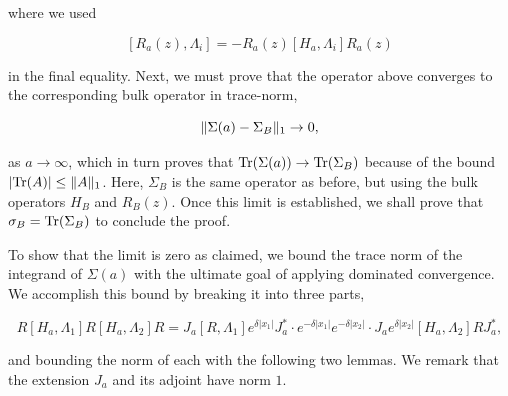 \documentclass[12pt, letterpaper]{article}
\begin{document}
where we used 

\[[R_a(z),\Lambda_i] = -R_a(z)[H_a,\Lambda_i]R_a(z)\]

in the final equality. Next, we must prove that the operator above converges to the corresponding bulk operator in trace-norm,

\[ \lVert \Sigma(a) - \Sigma_B \rVert_1 \to 0,\]

as $a\to\infty$, which in turn proves that $\text{Tr}(\Sigma(a))\to\text{Tr}(\Sigma_B)$ because of the bound $|\text{Tr}(A)|\leq \lVert A \rVert_1$. Here, $\Sigma_B$ is the same operator as before, but using the bulk operators $H_B$ and $R_B(z)$. Once this limit is established, we shall prove that $\sigma_B = \text{Tr}(\Sigma_B)$ to conclude the proof. 

To show that the limit is zero as claimed, we bound the trace norm of the integrand of $\Sigma(a)$ with the ultimate goal of applying dominated convergence. We accomplish this bound by breaking it into three parts,

\[R[H_a,\Lambda_1]R[H_a,\Lambda_2]R = J_a[R,\Lambda_1]e^{\delta|x_1|}J_a^*\cdot e^{-\delta|x_1|}e^{-\delta|x_2|}\cdot J_ae^{\delta|x_2|}[H_a, \Lambda_2]RJ_a^*,\]

and bounding the norm of each with the following two lemmas. We remark that the extension $J_a$ and its adjoint have norm $1$.
\end{document}
